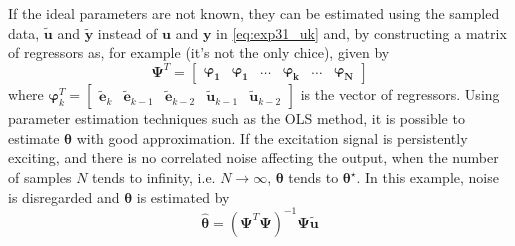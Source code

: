\begin{exmp}
   If the ideal parameters are not known, they can be estimated using the sampled data, $\tilde{\bm{u}}$ and $\tilde{\bm{y}}$ instead of $\bm{u}$ and $\bm{y}$ in \eqref{eq:exp31_uk} and, by constructing a matrix of regressors as, for example (it's not the only chice), given by
   \begin{equation*}
      \bm{\Psi}^T=\begin{bmatrix} \bm{\varphi_1} & \bm{\varphi_1} & \dots & \bm{\varphi_k}  & \dots & \bm{\varphi_N} \end{bmatrix}
   \end{equation*}
   where $\bm{\varphi}^T_k =\begin{bmatrix} \tilde{\bm{e}}_{k} & \tilde{\bm{e}}_{k-1} & \tilde{\bm{e}}_{k-2} & \tilde{\bm{u}}_{k-1} & \tilde{\bm{u}}_{k-2} \end{bmatrix}$ is the vector of regressors.
   Using parameter estimation techniques such as the OLS method, it is possible to estimate $\bm{\theta}$ with good approximation.
   If the excitation signal is persistently exciting, and there is no correlated noise affecting the output, when the number of samples $N$ tends to infinity, i.e. $N \to \infty$, $\bm{\theta}$ tends to $\bm{\theta}^\star$.
   In this example, noise is disregarded and $\bm{\theta}$ is estimated by
   \begin{equation*}
      \hat{\bm{\theta}} = (\bm{\Psi}^T\bm{\Psi})^{-1}\bm{\Psi}\tilde{\bm{u}}
   \label{eq:}
   \end{equation*}
   

\end{exmp}

